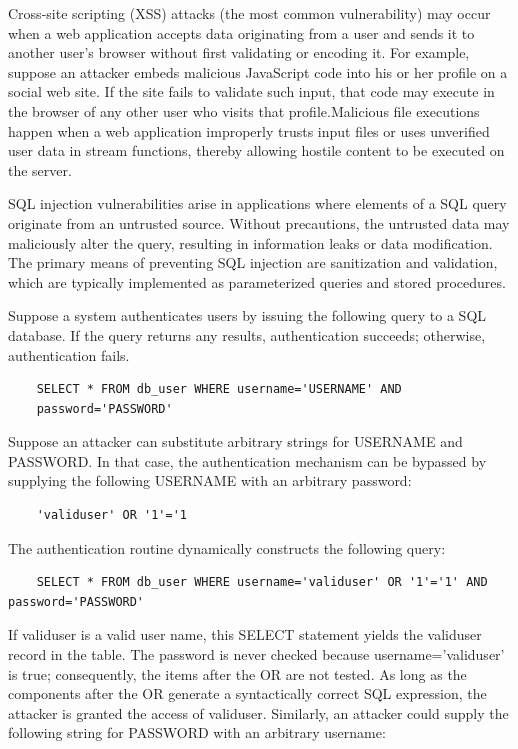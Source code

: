 Cross-site scripting (XSS) attacks (the most common vulnerability)
may occur when a web application accepts data originating
from a user and sends it to another user's browser without
first validating or encoding it. For example, suppose an attacker
embeds malicious JavaScript code into his or her profile on a
social web site. If the site fails to validate such input, that code
may execute in the browser of any other user who visits that
profile.Malicious file executions happen when a web application improperly trusts input files or uses unverified user data in stream functions, thereby allowing hostile content to be executed on the server.



SQL injection vulnerabilities arise in applications where elements of a SQL query originate from an untrusted source. Without precautions, the untrusted data may maliciously alter the query, resulting in information leaks or data modification. The primary means of preventing SQL injection are sanitization and validation, which are typically implemented as parameterized queries and stored procedures.

Suppose a system authenticates users by issuing the following query to a SQL database. If the query returns any results, authentication succeeds; otherwise, authentication fails.

\begin{lstlisting}
	SELECT * FROM db_user WHERE username='USERNAME' AND
	password='PASSWORD'
\end{lstlisting}

Suppose an attacker can substitute arbitrary strings for USERNAME and PASSWORD. In that case, the authentication mechanism can be bypassed by supplying the following USERNAME with an arbitrary password:

\begin{lstlisting}
	'validuser' OR '1'='1
\end{lstlisting}

The authentication routine dynamically constructs the following query:

\begin{lstlisting}
	SELECT * FROM db_user WHERE username='validuser' OR '1'='1' AND password='PASSWORD'
\end{lstlisting}

If validuser is a valid user name, this SELECT statement yields the validuser record in the table. The password is never checked because username='validuser' is true; consequently, the items after the OR are not tested. As long as the components after the OR generate a syntactically correct SQL expression, the attacker is granted the access of validuser.
Similarly, an attacker could supply the following string for PASSWORD with an arbitrary username:

